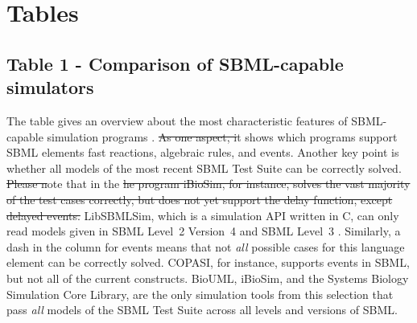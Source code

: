 \documentclass[10pt]{bmc_article}
\newenvironment{bmcformat}{\fussy\setboolean{publ}{true}}{\fussy}
\begin{document}
\begin{bmcformat}

\section*{Tables}

\subsection*{Table 1 - Comparison of SBML-capable simulators}
The table gives an overview about the most characteristic features of \acs{SBML}-capable simulation programs .
\sout{As one aspect, i}t shows which programs support \acs{SBML} elements fast reactions, algebraic rules, and events.
Another key point is whether all models of the most recent SBML Test Suite  can be correctly solved.
\sout{Please n}ote that in the  
\sout{he program iBioSim, for instance, solves the vast
majority of the test cases correctly, but does not yet support the delay function,
except delayed events.}
LibSBMLSim, which is a simulation \acs{API} written in C, can only read models given
in \acs{SBML} Level~2 Version~4 and \acs{SBML} Level~3
.
Similarly, a dash in the column for events means that not \emph{all} possible
cases for this language element can be correctly solved.
COPASI, for instance, supports events in \acs{SBML}, but not all of the current 
constructs.
BioUML, iBioSim, and the Systems Biology Simulation Core Library, are the 
only simulation tools from this selection that pass \emph{all} models of the
SBML Test Suite across all levels and versions of \acs{SBML}.


\end{bmcformat}
\end{document}
